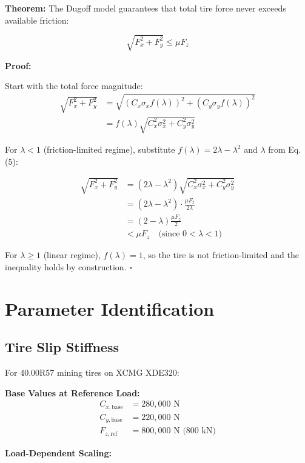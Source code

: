 \documentclass[11pt,a4paper]{article}
\newcommand{\qed}{\hfill$\square$}
\begin{document}
\textbf{Theorem:} The Dugoff model guarantees that total tire force never exceeds available friction:

\begin{equation}
\sqrt{F_x^2 + F_y^2} \leq \mu F_z
\end{equation}

\textbf{Proof:}

Start with the total force magnitude:
\begin{align}
\sqrt{F_x^2 + F_y^2} &= \sqrt{(C_x \sigma_x f(\lambda))^2 + (C_y \sigma_y f(\lambda))^2} \\
&= f(\lambda) \sqrt{C_x^2 \sigma_x^2 + C_y^2 \sigma_y^2}
\end{align}

For $\lambda < 1$ (friction-limited regime), substitute $f(\lambda) = 2\lambda - \lambda^2$ and $\lambda$ from Eq. (5):

\begin{align}
\sqrt{F_x^2 + F_y^2} &= (2\lambda - \lambda^2) \sqrt{C_x^2 \sigma_x^2 + C_y^2 \sigma_y^2} \\
&= (2\lambda - \lambda^2) \cdot \frac{\mu F_z}{2\lambda} \\
&= \left(2 - \lambda\right) \frac{\mu F_z}{2} \\
&< \mu F_z \quad \text{(since } 0 < \lambda < 1\text{)}
\end{align}

For $\lambda \geq 1$ (linear regime), $f(\lambda) = 1$, so the tire is not friction-limited and the inequality holds by construction. \qed

\section{Parameter Identification}

\subsection{Tire Slip Stiffness}

For 40.00R57 mining tires on XCMG XDE320:

\textbf{Base Values at Reference Load:}
\begin{align}
C_{x,\text{base}} &= 280{,}000 \text{ N} \\
C_{y,\text{base}} &= 220{,}000 \text{ N} \\
F_{z,\text{ref}} &= 800{,}000 \text{ N (800 kN)}
\end{align}

\textbf{Load-Dependent Scaling:}
\end{document}

